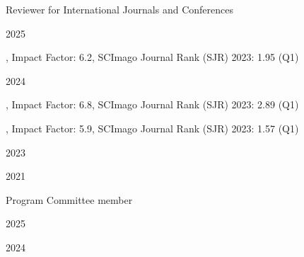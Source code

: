 \documentclass[
	a4paper, %
	10pt, %
]{tresume} %
\begin{document}
%
\begin{tSection}{Reviewer for International Journals and Conferences}
  \begin{tSubsection}{2025}{}{}{}
  \item {}
  \item {}
  \item {}
  \item {}, Impact Factor: 6.2, SCImago Journal Rank (SJR) 2023: 1.95 (Q1)
  \item {}
  \end{tSubsection}
  \begin{tSubsection}{2024}{}{}{}
  \item {}
  \item {}, Impact Factor: 6.8, SCImago Journal Rank (SJR) 2023: 2.89 (Q1)
  \item {}, Impact Factor: 5.9, SCImago Journal Rank (SJR) 2023: 1.57 (Q1)
  \end{tSubsection}
  \begin{tSubsection}{2023}{}{}{}
  \item {}
  \item {}
  \end{tSubsection}
  \begin{tSubsection}{2021}{}{}{}
  \item {}
  \end{tSubsection}
\end{tSection}
%
\begin{tSection}{Program Committee member}
  \begin{tSubsection}{2025}{}{}{}
    \item {}
    \item {}
  \end{tSubsection}
  \begin{tSubsection}{2024}{}{}{}
    \item {}
\end{tSubsection}
\end{tSection}
%
\end{document}
